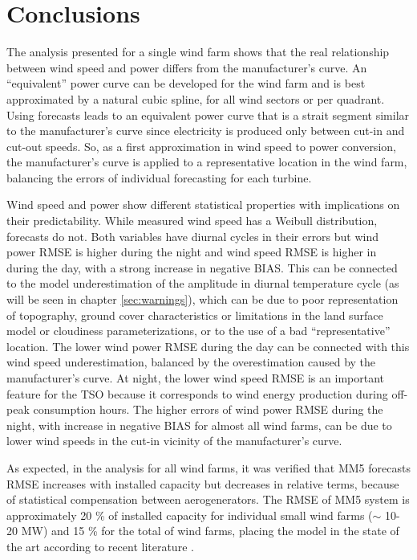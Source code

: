 

\FloatBarrier
\section{Conclusions}

The analysis presented for a single wind farm shows that the real relationship between wind speed and power differs from the manufacturer's curve. An ``equivalent'' power curve can be developed for the wind farm and is best approximated by a natural cubic spline, for all wind sectors or per quadrant. Using forecasts leads to an equivalent power curve that is a strait segment similar to the manufacturer's curve since electricity is produced only between cut-in and cut-out speeds. So, as a first approximation in wind speed to power conversion, the manufacturer's curve is applied to a representative location in the wind farm, balancing the errors of individual forecasting for each turbine.

Wind speed and power show different statistical properties with implications on their predictability. While measured wind speed has a Weibull distribution, forecasts do not. Both variables have diurnal cycles in their errors but wind power RMSE is higher during the night and wind speed RMSE is higher in during the day, with a strong increase in negative BIAS. This can be connected to the model underestimation of the amplitude in diurnal temperature cycle (as will be seen in chapter \ref{sec:warnings}), which can be due to poor representation of topography, ground cover characteristics or limitations in the land surface model or cloudiness parameterizations, or to the use of a bad ``representative'' location. The lower wind power RMSE during the day can be connected with this wind speed underestimation, balanced by the overestimation caused by the manufacturer's curve. At night, the lower wind speed RMSE is an important feature for the TSO because it corresponds to wind energy production during off-peak consumption hours. The higher errors of wind power RMSE during the night, with increase in negative BIAS for almost all wind farms, can be due to lower wind speeds in the cut-in vicinity of the manufacturer's curve.

As expected, in the analysis for all wind farms, it was verified that MM5 forecasts RMSE increases with installed capacity but decreases in relative terms, because of statistical compensation between aerogenerators. The RMSE of MM5 system is approximately 20 \% of installed capacity for individual small wind farms ($\sim$ 10-20 MW) and 15 \% for the total of wind farms, placing the model in the state of the art according to recent literature \citep{Foley2012}. 

